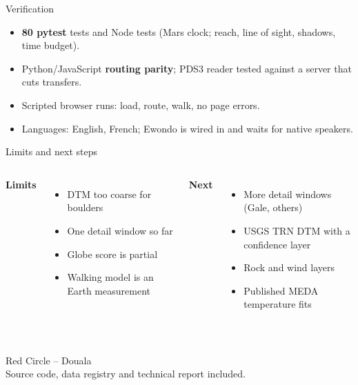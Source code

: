 \documentclass[aspectratio=169,11pt]{beamer}
\begin{document}
\begin{frame}{Verification}
\begin{itemize}
\item \textbf{80 pytest} tests and Node tests (Mars clock; reach, line of sight, shadows, time budget).
\item Python/JavaScript \textbf{routing parity}; PDS3 reader tested against a server that cuts transfers.
\item Scripted browser runs: load, route, walk, no page errors.
\item Languages: English, French; Ewondo is wired in and waits for native speakers.
\end{itemize}
\end{frame}

\begin{frame}{Limits and next steps}
\begin{columns}[T]
\textbf{Limits}
\begin{itemize}\small\item DTM too coarse for boulders\item One detail window so far\item Globe score is partial\item Walking model is an Earth measurement\end{itemize}
\textbf{Next}
\begin{itemize}\small\item More detail windows (Gale, others)\item USGS TRN DTM with a confidence layer\item Rock and wind layers\item Published MEDA temperature fits\end{itemize}
\end{columns}
\end{frame}

\begin{frame}[plain]
\centering{}\\[6mm]
{\large Red Circle -- Douala}\\[4mm]
\small Source code, data registry and technical report included.
\end{frame}
\end{document}
